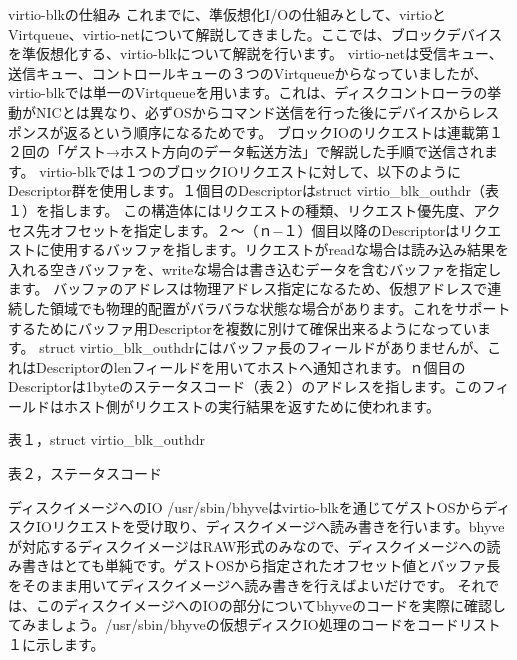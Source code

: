 virtio-blkの仕組み
これまでに、準仮想化I/Oの仕組みとして、virtioとVirtqueue、virtio-netについて解説してきました。ここでは、ブロックデバイスを準仮想化する、virtio-blkについて解説を行います。
virtio-netは受信キュー、送信キュー、コントロールキューの３つのVirtqueueからなっていましたが、virtio-blkでは単一のVirtqueueを用います。これは、ディスクコントローラの挙動がNICとは異なり、必ずOSからコマンド送信を行った後にデバイスからレスポンスが返るという順序になるためです。
ブロックIOのリクエストは連載第１２回の「ゲスト→ホスト方向のデータ転送方法」で解説した手順で送信されます。
virtio-blkでは１つのブロックIOリクエストに対して、以下のようにDescriptor群を使用します。１個目のDescriptorはstruct virtio_blk_outhdr（表１）を指します。
この構造体にはリクエストの種類、リクエスト優先度、アクセス先オフセットを指定します。２〜（ｎ−１）個目以降のDescriptorはリクエストに使用するバッファを指します。リクエストがreadな場合は読み込み結果を入れる空きバッファを、writeな場合は書き込むデータを含むバッファを指定します。
バッファのアドレスは物理アドレス指定になるため、仮想アドレスで連続した領域でも物理的配置がバラバラな状態な場合があります。これをサポートするためにバッファ用Descriptorを複数に別けて確保出来るようになっています。
struct virtio_blk_outhdrにはバッファ長のフィールドがありませんが、これはDescriptorのlenフィールドを用いてホストへ通知されます。ｎ個目のDescriptorは1byteのステータスコード（表２）のアドレスを指します。このフィールドはホスト側がリクエストの実行結果を返すために使われます。


表１，struct virtio_blk_outhdr

表２，ステータスコード

ディスクイメージへのIO
/usr/sbin/bhyveはvirtio-blkを通じてゲストOSからディスクIOリクエストを受け取り、ディスクイメージへ読み書きを行います。bhyveが対応するディスクイメージはRAW形式のみなので、ディスクイメージへの読み書きはとても単純です。ゲストOSから指定されたオフセット値とバッファ長をそのまま用いてディスクイメージへ読み書きを行えばよいだけです。
それでは、このディスクイメージへのIOの部分についてbhyveのコードを実際に確認してみましょう。/usr/sbin/bhyveの仮想ディスクIO処理のコードをコードリスト１に示します。

